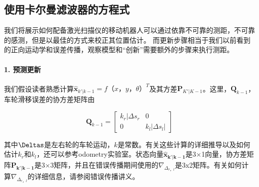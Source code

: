 \subsection{使用卡尔曼滤波器的方程式}
我们将展示如何配备激光扫描仪的移动机器人可以通过依靠不可靠的测距，不可靠的感测，但是以最佳的方式来校正其位置估计。
而更新步骤相当于我们以前看到的正向运动学和误差传播，观察模型和“创新”需要额外的步骤来执行测距。


\paragraph{1. 预测更新}
我们假设读者熟悉计算$\hat{\boldsymbol{x}}_{k'|k-1}=f（x，y，θ）^T$及其方差$\boldsymbol{P}_{K'|K-1}$。这里，$\boldsymbol{Q}_{k-1}$，车轮滑移误差的协方差矩阵由

\begin{equation}
\boldsymbol{Q}_{k-1}=\left[\begin{array}{cc}k_r|\Delta s_r & 0\\0 & k_l|\Delta s_l|\end{array}\right]
\end{equation}


其中$\Deltas$是左右轮的车轮运动，$k$是常数。有关这些计算的详细推导以及如何估计$k_r$和$k_l$，还可以参考odometry实验室。状态向量$\boldsymbol{\hat{x}_{k'|k-1}}$是3×1向量，协方差矩阵$\boldsymbol{P_{k'|k-1}}$是3×3矩阵，并且在错误传播期间使用的$\nabla_{\Delta_{r，l}}$是3x2矩阵。有关如何计算$\nabla_{\Delta_{r，l}}$的详细信息，请参阅错误传播讲义。

